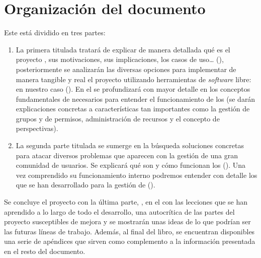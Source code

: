 \section{Organización del documento}
\label{section:organizacion-documento}

Este \pfc{} está dividido en tres partes:

\begin{enumerate}
\item La primera titulada  tratará de explicar de manera detallada qué es el proyecto \alma{}, sus motivaciones, sus implicaciones, los casos de uso\ldots{} (), posteriormente se analizarán las diversas opciones para implementar de manera tangible y real el proyecto utilizando herramientas de \textit{software} libre: \tiki{} en nuestro caso ().
En el  se profundizará con mayor detalle en los conceptos fundamentales de \tiki{} necesarios para entender el funcionamiento de los \profiles{} (se darán explicaciones concretas a características tan importantes como la gestión de grupos y de permisos, administración de recursos y el concepto de perspectivas).

\item La segunda parte titulada  se sumerge en la búsqueda soluciones concretas para atacar diversos problemas que aparecen con la gestión de una gran comunidad de usuarios.
Se explicará qué son y cómo funcionan los \profiles{} (). Una vez comprendido su funcionamiento interno podremos entender con detalle los \profiles{} que se han desarrollado para la gestión de \alma{} ().
\end{enumerate}

Se concluye el proyecto con la última parte, , en el  con las lecciones que se han aprendido a lo largo de todo el desarrollo, una autocrítica de las partes del proyecto susceptibles de mejora y se mostrarán unas ideas de lo que podrían ser las futuras líneas de trabajo. Además, al final del libro, se encuentran disponibles una serie de apéndices que sirven como complemento a la información presentada en el resto del documento. 
